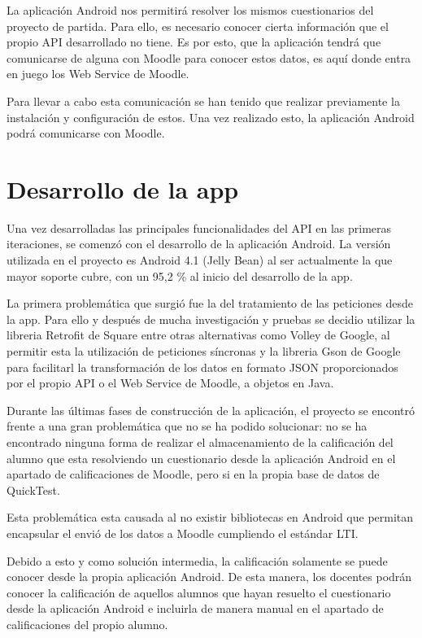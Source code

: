 La aplicación Android nos permitirá resolver los mismos cuestionarios del proyecto de partida. Para ello, es necesario conocer cierta información que el propio API desarrollado no tiene. Es por esto, que la aplicación tendrá que comunicarse de alguna con Moodle para conocer estos datos, es aquí donde entra en juego los Web Service de Moodle. 

Para llevar a cabo esta comunicación se han tenido que realizar previamente la instalación y configuración de estos. Una vez realizado esto, la aplicación Android podrá comunicarse con Moodle.


\section{Desarrollo de la app}

Una vez desarrolladas las principales funcionalidades del API en las primeras iteraciones, se comenzó con el desarrollo de la aplicación Android.
La versión utilizada en el proyecto es Android 4.1 (Jelly Bean) al ser actualmente la que mayor soporte cubre, con un 95,2 \% al inicio del desarrollo de la app.

La primera problemática que surgió fue la del tratamiento de las peticiones desde la app. Para ello y después de mucha investigación y pruebas se decidio utilizar la libreria Retrofit de Square \cite{wiki:retrofit} entre otras alternativas como Volley \cite{wiki:volley} de Google, al permitir esta la utilización de peticiones síncronas y la libreria Gson de Google \cite{wiki:gson} para facilitarl la transformación de los datos en formato JSON proporcionados por el propio API o el Web Service de Moodle, a objetos en Java.

Durante las últimas fases de construcción de la aplicación, el proyecto se encontró frente a una gran problemática que no se ha podido solucionar: no se ha encontrado ninguna forma de realizar el almacenamiento de la calificación del alumno que esta resolviendo un cuestionario desde la aplicación Android en el apartado de calificaciones de Moodle, pero si en la propia base de datos de QuickTest.

Esta problemática esta causada al no existir bibliotecas en Android que permitan encapsular el envió de los datos a Moodle cumpliendo el estándar LTI.

Debido a esto y como solución intermedia, la calificación solamente se puede conocer desde la propia aplicación Android. De esta manera, los docentes podrán conocer la calificación de aquellos alumnos que hayan resuelto el cuestionario desde la aplicación Android e incluirla de manera manual en el apartado de calificaciones del propio alumno.

